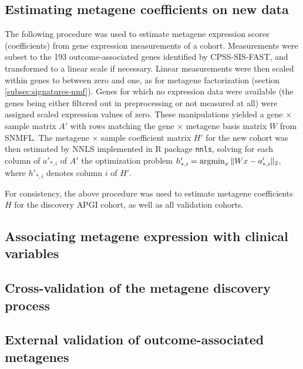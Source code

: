 \documentclass[dissertation.tex]{subfiles}
\begin{document}
\subsection{Estimating metagene coefficients on new data}
The following procedure was used to estimate metagene expression scores (coefficients) from gene expression measurements of a cohort.  Measurements were subset to the 193 outcome-associated genes identified by \gls{CPSS}-\gls{SIS}-\gls{FAST}, and transformed to a linear scale if necessary.  Linear measurements were then scaled within genes to between zero and one, as for metagene factorization (section \ref{subsec:signatures-nmf}).  Genes for which no expression data were available (the genes being either filtered out in preprocessing or not measured at all) were assigned scaled expression values of zero.  These manipulations yielded a gene $\times$ sample matrix $A'$ with rows matching the gene $\times$ metagene basis matrix $W$ from \gls{SNMFL}.  The metagene $\times$ sample coefficient matrix $H'$ for the new cohort was then estimated by \gls{NNLS} implemented in R package \texttt{nnls}, solving for each column of $a'_{*,i}$ of $A'$ the optimization problem ${h'_{*,i}} = \operatorname*{\arg\!\min}_x \| W x - a'_{*,i} \|_2$, where $h'_{*,i}$ denotes column $i$ of $H'$.

For consistency, the above procedure was used to estimate metagene coefficients $H$ for the discovery \gls{APGI} cohort, as well as all validation cohorts.

\subsection{Associating metagene expression with clinical variables}

\subsection{Cross-validation of the metagene discovery process}

\subsection{External validation of outcome-associated metagenes}
\end{document}
